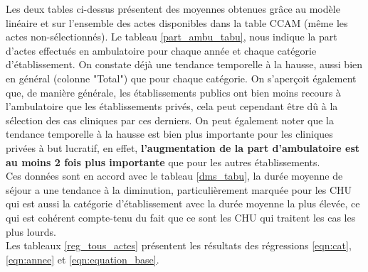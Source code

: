 \bigskip


Les deux tables ci-dessus présentent des moyennes obtenues grâce au modèle linéaire et sur l'ensemble des actes disponibles dans la table CCAM (même les actes non-sélectionnés). Le tableau \ref{part_ambu_tabu}, nous indique la part d'actes effectués en ambulatoire pour chaque année et chaque catégorie d'établissement. On constate déjà une tendance temporelle à la hausse, aussi bien en général (colonne "Total") que pour chaque catégorie. On s'aperçoit également que, de manière générale, les établissements publics ont bien moins recours à l'ambulatoire que les établissements privés, cela peut cependant être dû à la sélection des cas cliniques par ces derniers. On peut également noter que la tendance temporelle à la hausse est bien plus importante pour les cliniques privées à but lucratif, en effet, \textbf{l'augmentation de la part d'ambulatoire est au moins 2 fois plus importante} que pour les autres établissements.\\

Ces données sont en accord avec le tableau \ref{dms_tabu}, la durée moyenne de séjour a une tendance à la diminution, particulièrement marquée pour les CHU qui est aussi la catégorie d'établissement avec la durée moyenne la plus élevée, ce qui est cohérent compte-tenu du fait que ce sont les CHU qui traitent les cas les plus lourds.\\

Les tableaux \ref{reg_tous_actes} présentent les résultats des régressions \ref{eqn:cat}, \ref{eqn:annee} et \ref{eqn:equation_base}.\\


